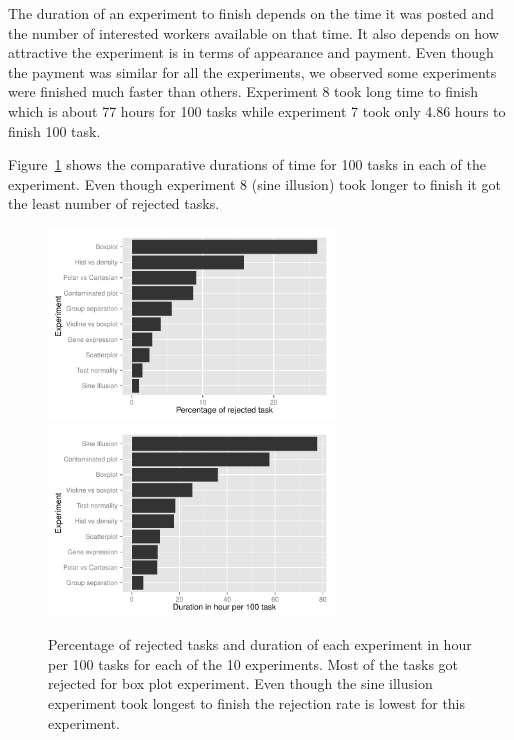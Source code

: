 \documentclass[11pt]{article}
\begin{document}

The duration of an experiment to finish depends on the time it was posted and the number of interested workers available on that time. It also depends on how attractive the experiment is in terms of appearance and payment. Even though the payment was similar for all the experiments, we observed some experiments were finished much faster than others. Experiment 8 took long time to finish which is about 77 hours for 100 tasks while experiment 7 took only 4.86 hours to finish 100 task.

Figure~\ref{fig:task_duration} shows the comparative durations of time for 100 tasks in each of the experiment. Even though experiment 8 (sine illusion) took longer to finish it got the least number of rejected tasks.



\begin{figure}[htbp] 
   \centering
   \includegraphics[width=3in]{rejected_task.pdf}
      \includegraphics[width=3in]{task_duration.pdf} 
   \caption{Percentage of rejected tasks and duration of each experiment in hour per 100 tasks for each of the 10 experiments. Most of the tasks got rejected for box plot experiment.  Even though the sine illusion experiment took longest to finish the rejection rate is lowest for this experiment.}
   \label{fig:task_duration}
\end{figure}
\end{document}
